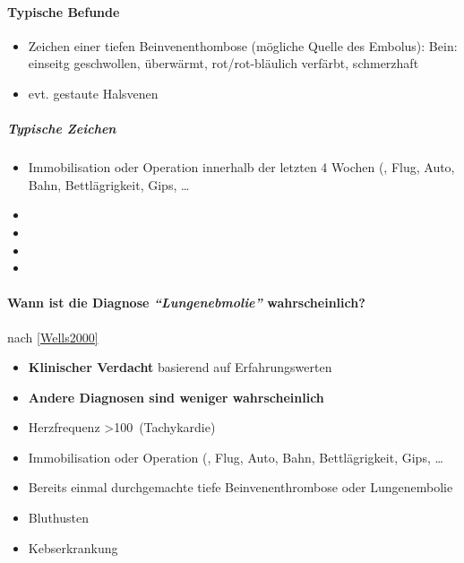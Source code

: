 \paragraph{Typische Befunde}

\begin{itemize}
    \item Zeichen einer tiefen Beinvenenthombose (mögliche
    Quelle des Embolus): Bein: einseitg geschwollen,
    überwärmt, rot/rot-bläulich verfärbt, schmerzhaft
    \item evt. gestaute Halsvenen
    
\end{itemize}

\subparagraph{Typische Zeichen}

\begin{itemize}
    \item Immobilisation oder Operation innerhalb
    der letzten 4 Wochen (, Flug, Auto,
    Bahn, Bettlägrigkeit, Gips, {\dots}
    \item 
    \item {}
    \item {}
    \item {}
\end{itemize}

\paragraph{Wann ist die Diagnose \emph{"`Lungenebmolie"'}
 wahrscheinlich?} nach
\ref{Wells2000}

\begin{itemize}
    \item {\bfseries Klinischer Verdacht} basierend auf
    Erfahrungswerten
    \item {\bfseries Andere Diagnosen sind weniger
    wahrscheinlich}
    \item Herzfrequenz \textgreater 100\,
    (Tachykardie)
    \item Immobilisation oder Operation  (, Flug, Auto,
    Bahn, Bettlägrigkeit, Gips, {\dots}
    \item Bereits einmal durchgemachte tiefe
    Beinvenenthrombose oder Lungenembolie
    \item Bluthusten
    \item Kebserkrankung 
\end{itemize}

